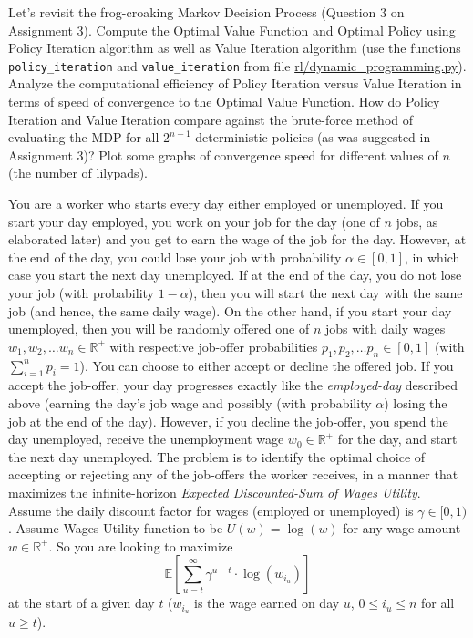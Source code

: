 \documentclass[12pt]{exam}
\begin{document}
\begin{questions}
 Let's revisit the frog-croaking Markov Decision Process (Question 3 on Assignment 3). Compute the Optimal Value Function and Optimal Policy using Policy Iteration algorithm as well as Value Iteration algorithm (use the functions \lstinline{policy_iteration} and \lstinline{value_iteration} from file \href{https://github.com/TikhonJelvis/RL-book/blob/master/rl/dynamic_programming.py}{rl\//dynamic\_programming.py}). Analyze the computational efficiency of Policy Iteration versus Value Iteration in terms of speed of convergence to the Optimal Value Function. How do Policy Iteration and Value Iteration compare against the brute-force method of evaluating the MDP for all $2^{n-1}$ deterministic policies (as was suggested in Assignment 3)? Plot some graphs of convergence speed for different values of $n$ (the number of lilypads).

 You are a worker who starts every day either employed or unemployed. If you start your day employed, you work on your job for the day (one of $n$ jobs, as elaborated later) and you get to earn the wage of the job for the day. However, at the end of the day, you could lose your job with probability $\alpha \in [0,1]$, in which case you start the next day unemployed. If at the end of the day, you do not lose your job (with probability $1-\alpha$), then you will start the next day with the same job (and hence, the same daily wage). On the other hand, if you start your day unemployed, then you will be randomly offered one of $n$ jobs with daily wages $w_1, w_2, \ldots w_n \in \mathbb{R}^+$ with respective job-offer probabilities $p_1, p_2, \ldots p_n \in [0,1]$ (with $\sum_{i=1}^n p_i = 1$). You can choose to either accept or decline the offered job. If you accept the job-offer, your day progresses exactly like the {\em employed-day} described above (earning the day's job wage and possibly (with probability $\alpha$) losing the job at the end of the day). However, if you decline the job-offer, you spend the day unemployed, receive the unemployment wage $w_0 \in \mathbb{R}^+$ for the day, and start the next day unemployed. The problem is to identify the optimal choice of accepting or rejecting any of the job-offers the worker receives, in a manner that maximizes the infinite-horizon {\em Expected Discounted-Sum of Wages Utility}. Assume the daily discount factor for wages (employed or unemployed) is $\gamma \in [0,1)$. Assume Wages Utility function to be $U(w) = \log(w)$ for any wage amount $w \in \mathbb{R}^+$. So you are looking to maximize
$$\mathbb{E}[\sum_{u=t}^\infty \gamma^{u-t} \cdot \log(w_{i_u})]$$
 at the start of a given day $t$ ($w_{i_u}$ is the wage earned on day $u$, $0\leq i_u \leq n$ for all $u\geq t$).


\end{questions}
\end{document}
